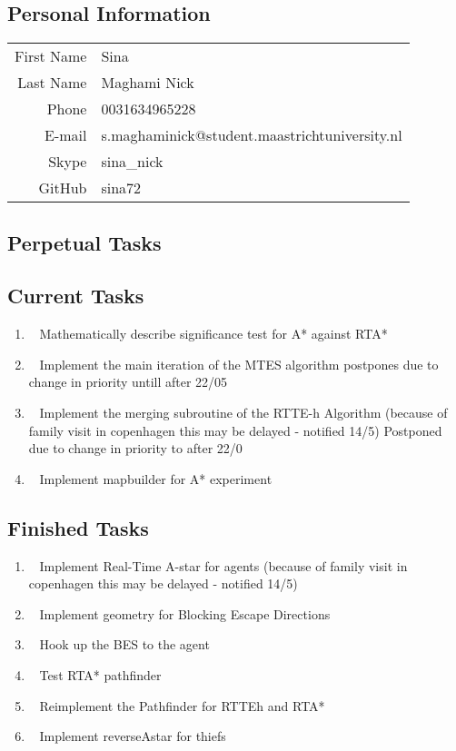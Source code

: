 \subsection{Personal Information}
\begin{table}[h!]
	\begin{tabular}{rl}
		First Name 	& Sina\\
		Last Name	& Maghami Nick\\
		Phone		& 0031634965228\\
		E-mail		& s.maghaminick@student.maastrichtuniversity.nl\\
		Skype		& sina\_nick\\
		GitHub		& sina72
	\end{tabular}
\end{table}
		
\subsection{Perpetual Tasks}
		
\subsection{Current Tasks}
\begin{enumerate}
	\item~
		Mathematically describe significance test for A* against RTA*
	\item~
		Implement the main iteration of the MTES algorithm
		\subitem postpones due to change in priority untill after 22/05
	\item~
		Implement the merging subroutine of the RTTE-h Algorithm
		\subitem (because of family visit in copenhagen this may be delayed - notified 14/5)
		\subitem Postponed due to change in priority to after 22/0
	\item~
		Implement mapbuilder for A* experiment
\end{enumerate}
\subsection{Finished Tasks}
\begin{enumerate}
	\item~
		Implement Real-Time A-star for agents
		\subitem (because of family visit in copenhagen this may be delayed - notified 14/5)
	\item~
		Implement geometry for Blocking Escape Directions
	\item~
		Hook up the BES to the agent
	\item~
		Test RTA* pathfinder
	\item~
		Reimplement the Pathfinder for RTTEh and RTA*
	\item~
		Implement reverseAstar for thiefs
\end{enumerate}
